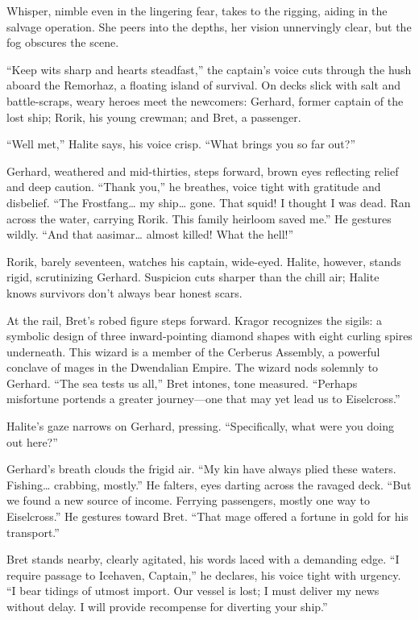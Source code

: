 \documentclass[
  letterpaper,12pt,twoside,twocolumn,openany,
  nodeprecatedcode,bg=full]{dndbook}
\begin{document}
Whisper, nimble even in the lingering fear, takes to the rigging, aiding
in the salvage operation. She peers into the depths, her vision
unnervingly clear, but the fog obscures the scene.

``Keep wits sharp and hearts steadfast,'' the captain's voice cuts
through the hush aboard the Remorhaz, a floating island of survival. On
decks slick with salt and battle-scraps, weary heroes meet the
newcomers: Gerhard, former captain of the lost ship; Rorik, his young
crewman; and Bret, a passenger.

``Well met,'' Halite says, his voice crisp. ``What brings you so far
out?''

Gerhard, weathered and mid-thirties, steps forward, brown eyes
reflecting relief and deep caution. ``Thank you,'' he breathes, voice
tight with gratitude and disbelief. ``The Frostfang\ldots{} my
ship\ldots{} gone. That squid! I thought I was dead. Ran across the
water, carrying Rorik. This family heirloom saved me.'' He gestures
wildly. ``And that aasimar\ldots{} almost killed! What the hell!''

Rorik, barely seventeen, watches his captain, wide-eyed. Halite,
however, stands rigid, scrutinizing Gerhard. Suspicion cuts sharper than
the chill air; Halite knows survivors don't always bear honest scars.

At the rail, Bret's robed figure steps forward. Kragor recognizes the
sigils: a symbolic design of three inward-pointing diamond shapes with
eight curling spires underneath. This wizard is a member of the Cerberus
Assembly, a powerful conclave of mages in the Dwendalian Empire. The
wizard nods solemnly to Gerhard. ``The sea tests us all,'' Bret intones,
tone measured. ``Perhaps misfortune portends a greater journey---one
that may yet lead us to Eiselcross.''

Halite's gaze narrows on Gerhard, pressing. ``Specifically, what were
you doing out here?''

Gerhard's breath clouds the frigid air. ``My kin have always plied these
waters. Fishing\ldots{} crabbing, mostly.'' He falters, eyes darting
across the ravaged deck. ``But we found a new source of income. Ferrying
passengers, mostly one way to Eiselcross.'' He gestures toward Bret.
``That mage offered a fortune in gold for his transport.''

Bret stands nearby, clearly agitated, his words laced with a demanding
edge. ``I require passage to Icehaven, Captain,'' he declares, his voice
tight with urgency. ``I bear tidings of utmost import. Our vessel is
lost; I must deliver my news without delay. I will provide recompense
for diverting your ship.''
\end{document}
